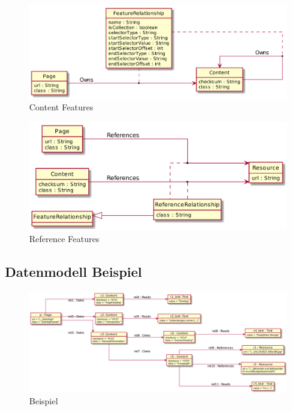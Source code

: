             \begin{figure}
                \centering
                \includegraphics[width=\textwidth]{../resources/db-data-model/content-relationship.png}
                \caption{Content Features}
                \label{image:dbDataModelContentRelationship}
            \end{figure}

            \begin{figure}
                \centering
                \includegraphics[width=\textwidth]{../resources/db-data-model/resource-relationship.png}
                \caption{Reference Features}
                \label{image:dbDataModelResourceRelationship}
            \end{figure}

        \subsection{Datenmodell Beispiel}
            \begin{figure}
                \centering
                \includegraphics[width=\textwidth]{../resources/db-data-model/example/example.png}
                \caption{Beispiel}
                \label{image:dbDataModelExampleOverview}
            \end{figure}

